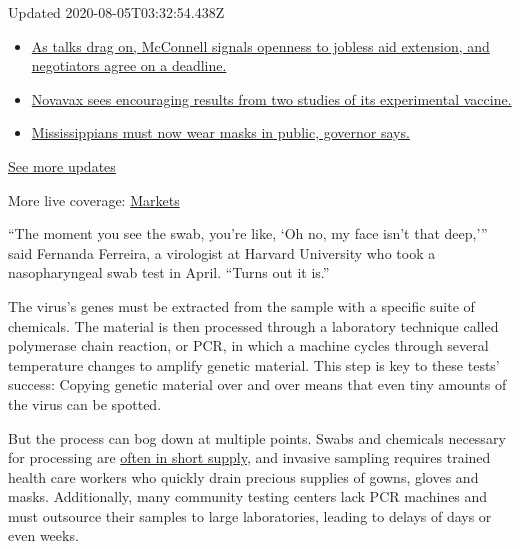 Updated 2020-08-05T03:32:54.438Z

\begin{itemize}
\tightlist
\item
  \href{https://www.nytimes.com/2020/08/04/world/coronavirus-cases.html?action=click\&pgtype=Article\&state=default\&region=MAIN_CONTENT_1\&context=storylines_live_updates\#link-762df92}{As
  talks drag on, McConnell signals openness to jobless aid extension,
  and negotiators agree on a deadline.}
\item
  \href{https://www.nytimes.com/2020/08/04/world/coronavirus-cases.html?action=click\&pgtype=Article\&state=default\&region=MAIN_CONTENT_1\&context=storylines_live_updates\#link-1228a480}{Novavax
  sees encouraging results from two studies of its experimental
  vaccine.}
\item
  \href{https://www.nytimes.com/2020/08/04/world/coronavirus-cases.html?action=click\&pgtype=Article\&state=default\&region=MAIN_CONTENT_1\&context=storylines_live_updates\#link-794484ed}{Mississippians
  must now wear masks in public, governor says.}
\end{itemize}

\href{https://www.nytimes.com/2020/08/04/world/coronavirus-cases.html?action=click\&pgtype=Article\&state=default\&region=MAIN_CONTENT_1\&context=storylines_live_updates}{See
more updates}

More live coverage:
\href{https://www.nytimes.com/live/2020/08/04/business/stock-market-today-coronavirus?action=click\&pgtype=Article\&state=default\&region=MAIN_CONTENT_1\&context=storylines_live_updates}{Markets}

``The moment you see the swab, you're like, `Oh no, my face isn't that
deep,''' said Fernanda Ferreira, a virologist at Harvard University who
took a nasopharyngeal swab test in April. ``Turns out it is.''

The virus's genes must be extracted from the sample with a specific
suite of chemicals. The material is then processed through a laboratory
technique called polymerase chain reaction, or PCR, in which a machine
cycles through several temperature changes to amplify genetic material.
This step is key to these tests' success: Copying genetic material over
and over means that even tiny amounts of the virus can be spotted.

But the process can bog down at multiple points. Swabs and chemicals
necessary for processing are
\href{https://www.nytimes.com/2020/03/18/health/coronavirus-test-shortages-face-masks-swabs.html}{often
in short supply}, and invasive sampling requires trained health care
workers who quickly drain precious supplies of gowns, gloves and masks.
Additionally, many community testing centers lack PCR machines and must
outsource their samples to large laboratories, leading to delays of days
or even weeks.

